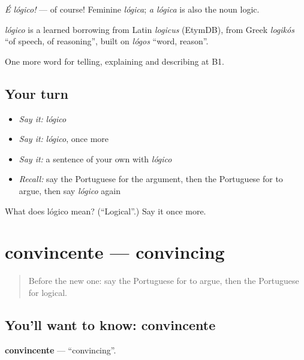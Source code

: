\emph{É lógico!} — of course! Feminine \emph{lógica}; \emph{a lógica} is also the noun logic.

\begin{cousinweb}
\emph{lógico} is a learned borrowing from Latin \emph{logicus} (EtymDB), from Greek \emph{logikós} \textquotedblleft{}of speech, of reasoning\textquotedblright{}, built on \emph{lógos} \textquotedblleft{}word, reason\textquotedblright{}.
\end{cousinweb}

\begin{grammarlens}[title={What you've built}]
One more word for telling, explaining and describing at B1.
\end{grammarlens}

\subsection*{Your turn}
\begin{itemize}
\raggedright
  \item \emph{Say it:} \emph{lógico}
  \item \emph{Say it:} \emph{lógico}, once more
  \item \emph{Say it:} a sentence of your own with \emph{lógico}
  \item \emph{Recall:} say the Portuguese for the argument, then the Portuguese for to argue, then say \emph{lógico} again
\end{itemize}

\begin{tcolorbox}[breakable,colback=teal!4,colframe=teal!35!black,title={Before you move on}]
What does lógico mean? (\textquotedblleft{}Logical\textquotedblright{}.) Say it once more.
\end{tcolorbox}
\section[convincente]{convincente — convincing}

\label{lesson:PT-C337-convincente}



\begin{quote}
Before the new one: say the Portuguese for to argue, then the Portuguese for logical.
\end{quote}

\subsection*{You'll want to know: convincente}
\textbf{convincente} — \textquotedblleft{}convincing\textquotedblright{}.

